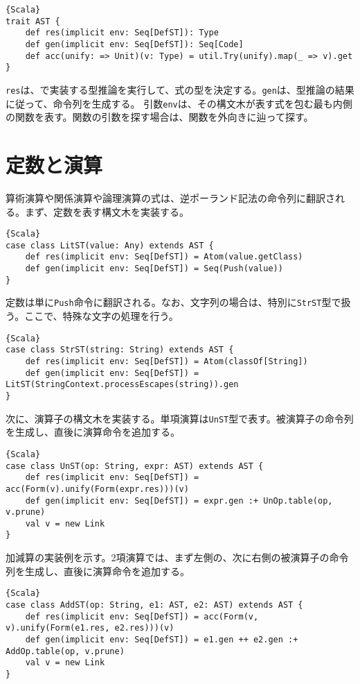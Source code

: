 \documentclass[10pt,a4paper]{book}
\begin{document}
\begin{Verbatim}{Scala}
trait AST {
	def res(implicit env: Seq[DefST]): Type
	def gen(implicit env: Seq[DefST]): Seq[Code]
	def acc(unify: => Unit)(v: Type) = util.Try(unify).map(_ => v).get
}
\end{Verbatim}

\texttt{res}は、で実装する型推論を実行して、式の型を決定する。\texttt{gen}は、型推論の結果に従って、命令列を生成する。
引数\texttt{env}は、その構文木が表す式を包む最も内側の関数を表す。関数の引数を探す場合は、関数を外向きに辿って探す。

\section{定数と演算\label{sect:OpST}}

算術演算や関係演算や論理演算の式は、逆ポーランド記法の命令列に翻訳される。まず、定数を表す構文木を実装する。

\begin{Verbatim}{Scala}
case class LitST(value: Any) extends AST {
	def res(implicit env: Seq[DefST]) = Atom(value.getClass)
	def gen(implicit env: Seq[DefST]) = Seq(Push(value))
}
\end{Verbatim}

定数は単に\texttt{Push}命令に翻訳される。なお、文字列の場合は、特別に\texttt{StrST}型で扱う。ここで、特殊な文字の処理を行う。

\begin{Verbatim}{Scala}
case class StrST(string: String) extends AST {
	def res(implicit env: Seq[DefST]) = Atom(classOf[String])
	def gen(implicit env: Seq[DefST]) = LitST(StringContext.processEscapes(string)).gen
}
\end{Verbatim}

次に、演算子の構文木を実装する。単項演算は\texttt{UnST}型で表す。被演算子の命令列を生成し、直後に演算命令を追加する。

\begin{Verbatim}{Scala}
case class UnST(op: String, expr: AST) extends AST {
	def res(implicit env: Seq[DefST]) = acc(Form(v).unify(Form(expr.res)))(v)
	def gen(implicit env: Seq[DefST]) = expr.gen :+ UnOp.table(op, v.prune)
	val v = new Link
}
\end{Verbatim}

加減算の実装例を示す。2項演算では、まず左側の、次に右側の被演算子の命令列を生成し、直後に演算命令を追加する。

\begin{Verbatim}{Scala}
case class AddST(op: String, e1: AST, e2: AST) extends AST {
	def res(implicit env: Seq[DefST]) = acc(Form(v, v).unify(Form(e1.res, e2.res)))(v)
	def gen(implicit env: Seq[DefST]) = e1.gen ++ e2.gen :+ AddOp.table(op, v.prune)
	val v = new Link
}
\end{Verbatim}
\end{document}
